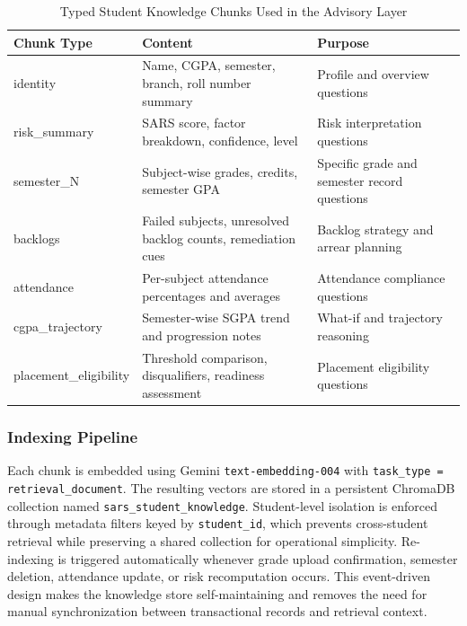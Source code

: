 \documentclass{article}
\begin{document}
\begin{table}[t]
\caption{Typed Student Knowledge Chunks Used in the Advisory Layer}
\label{tab:chunks}
\centering
\small
\begin{tabularx}{\textwidth}{lXX}
\toprule
Chunk Type & Content & Purpose \\
\midrule
identity & Name, CGPA, semester, branch, roll number summary & Profile and overview questions \\
risk\_summary & SARS score, factor breakdown, confidence, level & Risk interpretation questions \\
semester\_N & Subject-wise grades, credits, semester GPA & Specific grade and semester record questions \\
backlogs & Failed subjects, unresolved backlog counts, remediation cues & Backlog strategy and arrear planning \\
attendance & Per-subject attendance percentages and averages & Attendance compliance questions \\
cgpa\_trajectory & Semester-wise SGPA trend and progression notes & What-if and trajectory reasoning \\
placement\_eligibility & Threshold comparison, disqualifiers, readiness assessment & Placement eligibility questions \\
\bottomrule
\end{tabularx}
\normalsize
\end{table}

\subsubsection{Indexing Pipeline}
Each chunk is embedded using Gemini \texttt{text-embedding-004} with \texttt{task\_type = retrieval\_document}. The resulting vectors are stored in a persistent ChromaDB collection named \texttt{sars\_student\_knowledge}. Student-level isolation is enforced through metadata filters keyed by \texttt{student\_id}, which prevents cross-student retrieval while preserving a shared collection for operational simplicity. Re-indexing is triggered automatically whenever grade upload confirmation, semester deletion, attendance update, or risk recomputation occurs. This event-driven design makes the knowledge store self-maintaining and removes the need for manual synchronization between transactional records and retrieval context.
\end{document}
